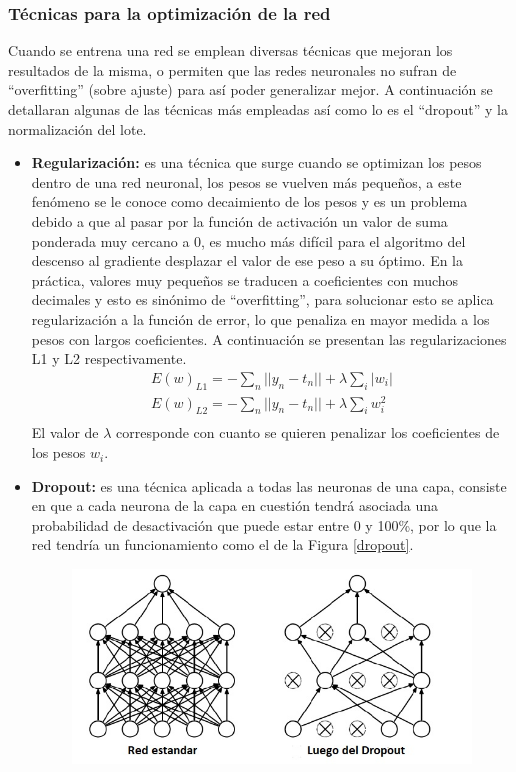 \subsubsection{Técnicas para la optimización de la red}
Cuando se entrena una red se emplean diversas técnicas que mejoran los resultados de la misma, o permiten que las redes neuronales no sufran de ``overfitting'' (sobre ajuste) para así poder generalizar mejor. A continuación se detallaran algunas de las técnicas más empleadas así como lo es el ``dropout'' y la normalización del lote.
\begin{itemize}
    \item \textbf{Regularización:} es una técnica que surge cuando se optimizan los pesos dentro de una red neuronal, los pesos se vuelven más pequeños, a este fenómeno se le conoce como decaimiento de los pesos y es un problema debido a que al pasar por la función de activación un valor de suma ponderada muy cercano a 0, es mucho más difícil para el algoritmo del descenso al gradiente desplazar el valor de ese peso a su óptimo. En la práctica, valores muy pequeños se traducen a coeficientes con muchos decimales y esto es sinónimo de ``overfitting'', para solucionar esto se aplica regularización a la función de error, lo que penaliza en mayor medida a los pesos con largos coeficientes. A continuación se presentan las regularizaciones L1 y L2 respectivamente.
    \begin{align}
          E(w)_{L1} = - \sum_{n} ||y_{n} - t_{n}|| + \lambda \sum_{i} |w_{i}|\\
          E(w)_{L2} = - \sum_{n} ||y_{n} - t_{n}|| + \lambda \sum_{i} w_{i}^{2}\\
    \end{align}
    El valor de $\lambda$ corresponde con cuanto se quieren penalizar los coeficientes de los pesos $w_{i}$.
    \item \textbf{Dropout:} es una técnica aplicada a todas las neuronas de una capa, consiste en que a cada neurona de la capa en cuestión tendrá asociada una probabilidad de desactivación que puede estar entre 0 y 100\%, por lo que la red tendría un funcionamiento como el de la Figura \ref{dropout}.
    \begin{figure}[H]
        \centering
        \includegraphics[scale=0.7]{Recursos/Dropout.jpg}

\end{figure}
\end{itemize}
